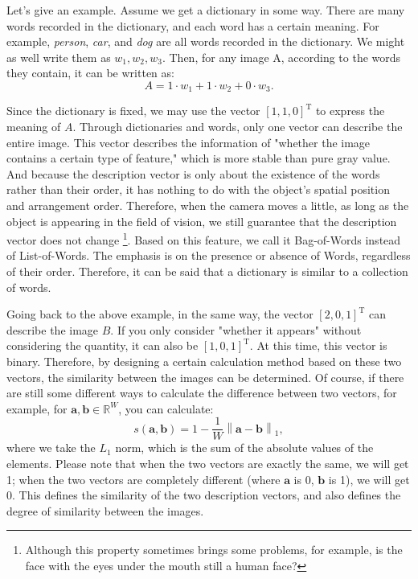 Let's give an example. Assume we get a dictionary in some way. There are many words recorded in the dictionary, and each word has a certain meaning. For example, \textit{person}, \textit{car}, and \textit{dog} are all words recorded in the dictionary. We might as well write them as $w_1, w_2, w_3$. Then, for any image A, according to the words they contain, it can be written as:
\begin{equation}
	A = 1 \cdot w_1+1\cdot w_2 + 0 \cdot w_3.
\end{equation}

Since the dictionary is fixed, we may use the vector $[1,1,0]^\mathrm{T}$ to express the meaning of $A$. Through dictionaries and words, only one vector can describe the entire image. This vector describes the information of "whether the image contains a certain type of feature," which is more stable than pure gray value. And because the description vector is only about the existence of the words rather than their order, it has nothing to do with the object's spatial position and arrangement order. Therefore, when the camera moves a little, as long as the object is appearing in the field of vision, we still guarantee that the description vector does not change \footnote{Although this property sometimes brings some problems, for example, is the face with the eyes under the mouth still a human face? }. Based on this feature, we call it Bag-of-Words instead of List-of-Words. The emphasis is on the presence or absence of Words, regardless of their order. Therefore, it can be said that a dictionary is similar to a collection of words.

Going back to the above example, in the same way, the vector $[2,0,1]^\mathrm{T}$ can describe the image $B$. If you only consider "whether it appears" without considering the quantity, it can also be $[1,0,1]^\mathrm{T}$. At this time, this vector is binary. Therefore, by designing a certain calculation method based on these two vectors, the similarity between the images can be determined. Of course, if there are still some different ways to calculate the difference between two vectors, for example, for $\bm{a}, \bm{b} \in \mathbb{R}^W$, you can calculate:
\begin{equation}
	s\left( {\bm{a},\bm{b}} \right) = 1 - \frac{1}{W}\left\| {\bm{a} - \bm{b}} \right\|_1,
\end{equation}
where we take the $L_1$ norm, which is the sum of the absolute values of the elements. Please note that when the two vectors are exactly the same, we will get 1; when the two vectors are completely different (where $\bm{a}$ is 0, $\bm{b}$ is 1), we will get 0. This defines the similarity of the two description vectors, and also defines the degree of similarity between the images.


